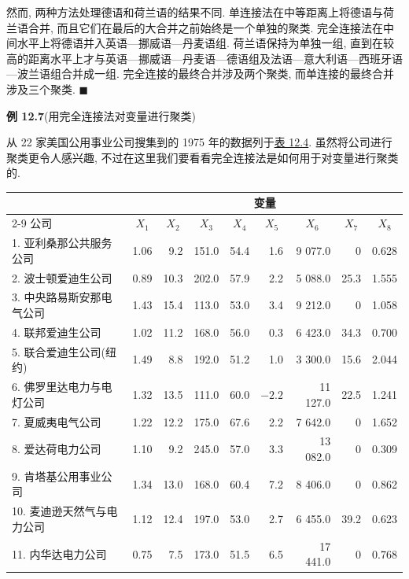然而, 两种方法处理德语和荷兰语的结果不同. 单连接法在中等距离上将德语与荷兰语合并, 而且它们在最后的大合并之前始终是一个单独的聚类. 完全连接法在中间水平上将德语并入英语—挪威语—丹麦语组. 荷兰语保持为单独一组, 直到在较高的距离水平上才与英语—挪威语—丹麦语—德语组及法语—意大利语—西班牙语—波兰语组合并成一组. 完全连接的最终合并涉及两个聚类, 而单连接的最终合并涉及三个聚类. \hfill$\blacksquare$

\medskip
\noindent\textbf{例 12.7}\quad (用完全连接法对变量进行聚类)

从 22 家美国公用事业公司搜集到的 1975 年的数据列于\hyperref[tab:12.4]{表 12.4}. 虽然将公司进行聚类更令人感兴趣, 不过在这里我们要看看完全连接法是如何用于对变量进行聚类的.

\begin{mvtable}
\label{tab:12.4}
\footnotesize
\begin{tabular}{lrrrrrrrr}
\toprule
 & \multicolumn{8}{c}{变\quad 量}\\
\cmidrule(lr){2-9}
公\quad 司 & \multicolumn{1}{c}{$X_1$} & \multicolumn{1}{c}{$X_2$} & \multicolumn{1}{c}{$X_3$} & \multicolumn{1}{c}{$X_4$} & \multicolumn{1}{c}{$X_5$} & \multicolumn{1}{c}{$X_6$} & \multicolumn{1}{c}{$X_7$} & \multicolumn{1}{c}{$X_8$}\\
\midrule
1. 亚利桑那公共服务公司 & 1.06 & 9.2 & 151.0 & 54.4 & 1.6 & 9 077.0 & 0 & 0.628\\
2. 波士顿爱迪生公司 & 0.89 & 10.3 & 202.0 & 57.9 & 2.2 & 5 088.0 & 25.3 & 1.555\\
3. 中央路易斯安那电气公司 & 1.43 & 15.4 & 113.0 & 53.0 & 3.4 & 9 212.0 & 0 & 1.058\\
4. 联邦爱迪生公司 & 1.02 & 11.2 & 168.0 & 56.0 & 0.3 & 6 423.0 & 34.3 & 0.700\\
5. 联合爱迪生公司(纽约) & 1.49 & 8.8 & 192.0 & 51.2 & 1.0 & 3 300.0 & 15.6 & 2.044\\
6. 佛罗里达电力与电灯公司 & 1.32 & 13.5 & 111.0 & 60.0 & $-2.2$ & 11 127.0 & 22.5 & 1.241\\
7. 夏威夷电气公司 & 1.22 & 12.2 & 175.0 & 67.6 & 2.2 & 7 642.0 & 0 & 1.652\\
8. 爱达荷电力公司 & 1.10 & 9.2 & 245.0 & 57.0 & 3.3 & 13 082.0 & 0 & 0.309\\
9. 肯塔基公用事业公司 & 1.34 & 13.0 & 168.0 & 60.4 & 7.2 & 8 406.0 & 0 & 0.862\\
10. 麦迪逊天然气与电力公司 & 1.12 & 12.4 & 197.0 & 53.0 & 2.7 & 6 455.0 & 39.2 & 0.623\\
11. 内华达电力公司 & 0.75 & 7.5 & 173.0 & 51.5 & 6.5 & 17 441.0 & 0 & 0.768\\

\end{tabular}
\end{mvtable}
